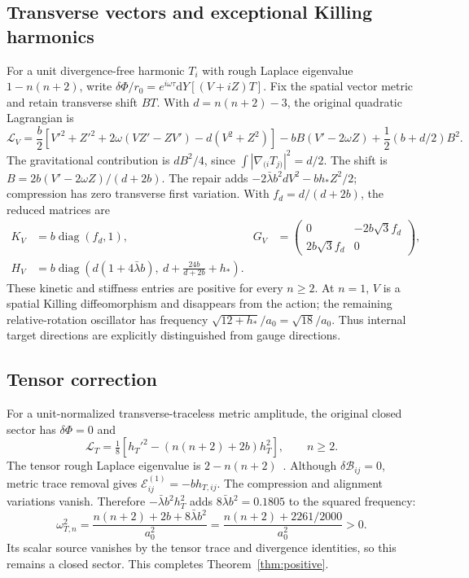 \documentclass[11pt]{article}
\newcommand{\diag}{\operatorname{diag}}
\newcommand{\dd}{\mathrm d}
\numberwithin{equation}{section}
\begin{document}
\subsection{Transverse vectors and exceptional Killing harmonics}

For a unit divergence-free harmonic $T_i$ with rough Laplace eigenvalue $1-n(n+2)$, write $\delta\Phi/r_0=e^{i\omega\tau}\dd Y[(V+iZ)T]$.
Fix the spatial vector metric and retain transverse shift $BT$.
With $d=n(n+2)-3$, the original quadratic Lagrangian is
\begin{equation}
 \mathcal L_V=\frac b2[V'^2+Z'^2+2\omega(VZ'-ZV')-d(V^2+Z^2)]
 -bB(V'-2\omega Z)+\frac12(b+d/2)B^2.
\end{equation}
The gravitational contribution is $dB^2/4$, since $\int|\nabla_{(i}T_{j)}|^2=d/2$.
The shift is $B=2b(V'-2\omega Z)/(d+2b)$.
The repair adds $-2\bar\lambda b^2dV^2-bh_*Z^2/2$; compression has zero transverse first variation.
With $f_d=d/(d+2b)$, the reduced matrices are
\begin{align}
 K_V&=b\diag(f_d,1),&G_V&=\begin{pmatrix}0&-2b\sqrt3f_d\\2b\sqrt3f_d&0\end{pmatrix},\\
 H_V&=b\diag\left(d(1+4\bar\lambda b),\ d+\frac{24b}{d+2b}+h_*\right).
\end{align}
These kinetic and stiffness entries are positive for every $n\ge2$.
At $n=1$, $V$ is a spatial Killing diffeomorphism and disappears from the action; the remaining relative-rotation oscillator has frequency $\sqrt{12+h_*}/a_0=\sqrt{18}/a_0$.
Thus internal target directions are explicitly distinguished from gauge directions.

\subsection{Tensor correction}

For a unit-normalized transverse-traceless metric amplitude, the original closed sector has $\delta\Phi=0$ and
\begin{equation}
 \mathcal L_T=\tfrac18[h_T'^2-(n(n+2)+2b)h_T^2],\qquad n\ge2.
\end{equation}
The tensor rough Laplace eigenvalue is $2-n(n+2)$~\cite{harmonics}.
Although $\delta\mathcal B_{ij}=0$, metric trace removal gives $\mathcal E^{(1)}_{ij}=-bh_{T,ij}$.
The compression and alignment variations vanish.
Therefore $-\bar\lambda b^2h_T^2$ adds $8\bar\lambda b^2=0.1805$ to the squared frequency:
\begin{equation}
 \omega_{T,n}^2=\frac{n(n+2)+2b+8\bar\lambda b^2}{a_0^2}
 =\frac{n(n+2)+2261/2000}{a_0^2}>0.
\end{equation}
Its scalar source vanishes by the tensor trace and divergence identities, so this remains a closed sector.
This completes Theorem~\ref{thm:positive}.
\end{document}
